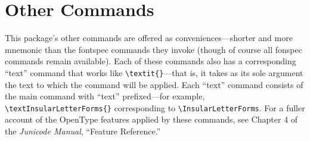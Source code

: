 \documentclass[12pt]{article}
\begin{document}
\section{Other Commands}

This package's other commands are offered as conveniences---shorter and more
mnemonic than the fontspec commands they invoke (though of course all fonspec commands
remain available). Each of these commands
also has a corresponding “text” command that works like 
{\small\verb|\textit{}|}—that is, it takes
as its sole argument the text to which the command will be applied. Each “text” command
consists of the main command with “text” prefixed—for example,
{\small\verb|\textInsularLetterForms{}|}
corresponding to {\small\verb|\InsularLetterForms|}.  For a fuller account of the OpenType features
applied by these commands, see Chapter 4 of the \textit{Junicode Manual}, “Feature Reference.”
\end{document}
